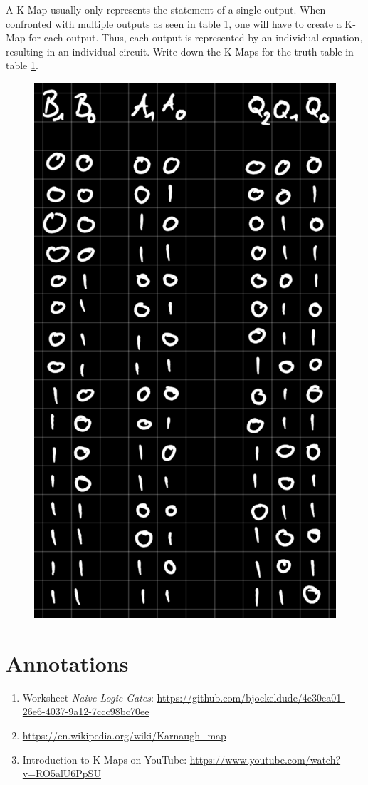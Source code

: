 \documentclass{dcbl/challenge}
\begin{document}
\begin{aufgabe}
    A K-Map usually only represents the statement of a single output. 
    When confronted with multiple outputs as seen in table \ref{fig:adder}, one will have to create a K-Map for each output.
    Thus, each output is represented by an individual equation, resulting in an individual circuit. 
    Write down the K-Maps for the truth table in table \ref{fig:adder}.
    \begin{figure}
        \centering
        \includegraphics[width=.6\linewidth]{ADDER.png}
        \label{fig:adder} 
    \end{figure}
\end{aufgabe}


\section*{Annotations}
\begin{enumerate}
    \item Worksheet \textit{Naive Logic Gates}: \url{https://github.com/bjoekeldude/4e30ea01-26e6-4037-9a12-7ccc98bc70ee}
    \item \url{https://en.wikipedia.org/wiki/Karnaugh_map}
    \item Introduction to K-Maps on YouTube: \url{https://www.youtube.com/watch?v=RO5alU6PpSU}
\end{enumerate}
\end{document}
